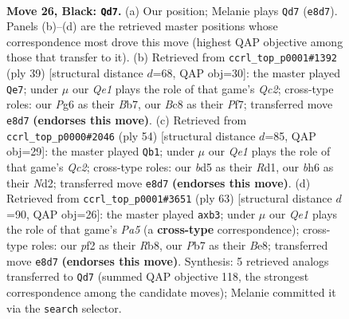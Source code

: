 \documentclass[11pt]{article}
\begin{document}
\clearpage

\begin{figure}[p]\centering
\begin{subfigure}{0.46\textwidth}\centering
\resizebox{\linewidth}{!}{%
\newchessgame
\chessboard[
  setfen={1rb1q2k/ppb4p/5ppB/3B4/7P/3P1NPn/PPPQ1PK1/4R3 b - - 4 26},
  showmover=false,
  pgfstyle=straightmove, color=movearrow, markmove={e8-d7}
]}
\caption{}
\end{subfigure}\hfill
\begin{subfigure}{0.46\textwidth}\centering
\resizebox{\linewidth}{!}{%
\newchessgame
\chessboard[
  setfen={5r1k/pbq2pp1/1p1b3p/3p1B2/4n3/1P2PN2/PQ1B1PPP/2R3K1 b - - 1 20},
  showmover=false,
  pgfstyle=straightmove, color=movearrow, markmove={c7-e7}
]}
\caption{}
\end{subfigure}
\\[4pt]
\begin{subfigure}{0.46\textwidth}\centering
\resizebox{\linewidth}{!}{%
\newchessgame
\chessboard[
  setfen={1br3k1/1b1q1pp1/pp2p2p/4n3/5B2/P3P2P/1PQNBPP1/3R2K1 w - - 7 28},
  showmover=false,
  pgfstyle=straightmove, color=movearrow, markmove={c2-b1}
]}
\caption{}
\end{subfigure}\hfill
\begin{subfigure}{0.46\textwidth}\centering
\resizebox{\linewidth}{!}{%
\newchessgame
\chessboard[
  setfen={1r2b1k1/4q2p/B2pPb2/4npp1/p2B4/1P2P2P/5PP1/2RQ1NK1 b - - 0 32},
  showmover=false,
  pgfstyle=straightmove, color=movearrow, markmove={a4-b3}
]}
\caption{}
\end{subfigure}
\caption{\textbf{Move 26, Black: \texttt{Qd7}.} (a) Our position; Melanie plays \texttt{Qd7} (\texttt{e8d7}). Panels (b)--(d) are the retrieved master positions whose correspondence most drove this move (highest QAP objective among those that transfer to it). (b) Retrieved from \texttt{ccrl\_top\_p0001\#1392} (ply 39) [structural distance $d$=68, QAP obj=30]: the master played \texttt{Qe7}; under $\mu$ our \emph{Qe1} plays the role of that game's \emph{Qc2}; cross-type roles: our \emph{P}g6 as their \emph{B}b7, our \emph{B}c8 as their \emph{P}f7; transferred move \texttt{e8d7} \textbf{(endorses this move)}. (c) Retrieved from \texttt{ccrl\_top\_p0000\#2046} (ply 54) [structural distance $d$=85, QAP obj=29]: the master played \texttt{Qb1}; under $\mu$ our \emph{Qe1} plays the role of that game's \emph{Qc2}; cross-type roles: our \emph{b}d5 as their \emph{R}d1, our \emph{b}h6 as their \emph{N}d2; transferred move \texttt{e8d7} \textbf{(endorses this move)}. (d) Retrieved from \texttt{ccrl\_top\_p0001\#3651} (ply 63) [structural distance $d$=90, QAP obj=26]: the master played \texttt{axb3}; under $\mu$ our \emph{Qe1} plays the role of that game's \emph{Pa5} (a \textbf{cross-type} correspondence); cross-type roles: our \emph{p}f2 as their \emph{R}b8, our \emph{P}b7 as their \emph{B}e8; transferred move \texttt{e8d7} \textbf{(endorses this move)}. Synthesis: 5 retrieved analogs transferred to \texttt{Qd7} (summed QAP objective 118, the strongest correspondence among the candidate moves); Melanie committed it via the \texttt{search} selector.}
\label{fig:thought-m51}
\end{figure}
\end{document}
